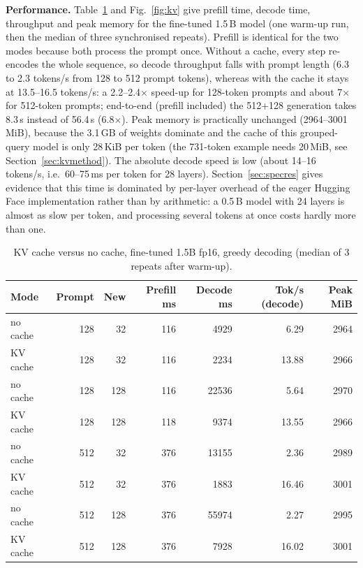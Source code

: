 \textbf{Performance.} Table~\ref{tab:kvbench} and Fig.~\ref{fig:kv} give prefill time, decode time, throughput and peak memory for the fine-tuned 1.5\,B model (one warm-up run, then the median of three synchronised repeats). Prefill is identical for the two modes because both process the prompt once. Without a cache, every step re-encodes the whole sequence, so decode throughput falls with prompt length (6.3 to 2.3 tokens/s from 128 to 512 prompt tokens), whereas with the cache it stays at 13.5--16.5 tokens/s: a 2.2--2.4$\times$ speed-up for 128-token prompts and about 7$\times$ for 512-token prompts; end-to-end (prefill included) the 512+128 generation takes 8.3\,s instead of 56.4\,s (6.8$\times$). Peak memory is practically unchanged (2964--3001\,MiB), because the 3.1\,GB of weights dominate and the cache of this grouped-query model is only 28\,KiB per token (the 731-token example needs 20\,MiB, see Section~\ref{sec:kvmethod}). The absolute decode speed is low (about 14--16 tokens/s, i.e.\ 60--75\,ms per token for 28 layers). Section~\ref{sec:specres} gives evidence that this time is dominated by per-layer overhead of the eager Hugging Face implementation rather than by arithmetic: a 0.5\,B model with 24 layers is almost as slow per token, and processing several tokens at once costs hardly more than one.

\begin{table}[t]
\caption{KV cache versus no cache, fine-tuned 1.5B fp16, greedy decoding (median of 3 repeats after warm-up).}
\label{tab:kvbench}
\centering\footnotesize
\begin{tabular}{lrrrrrr}
\hline
Mode & Prompt & New & Prefill ms & Decode ms & Tok/s (decode) & Peak MiB \\
\hline
no cache & 128 & 32 & 116 & 4929 & 6.29 & 2964 \\
KV cache & 128 & 32 & 116 & 2234 & 13.88 & 2966 \\
no cache & 128 & 128 & 116 & 22536 & 5.64 & 2970 \\
KV cache & 128 & 128 & 118 & 9374 & 13.55 & 2966 \\
no cache & 512 & 32 & 376 & 13155 & 2.36 & 2989 \\
KV cache & 512 & 32 & 376 & 1883 & 16.46 & 3001 \\
no cache & 512 & 128 & 376 & 55974 & 2.27 & 2995 \\
KV cache & 512 & 128 & 376 & 7928 & 16.02 & 3001 \\
\hline
\end{tabular}
\end{table}

